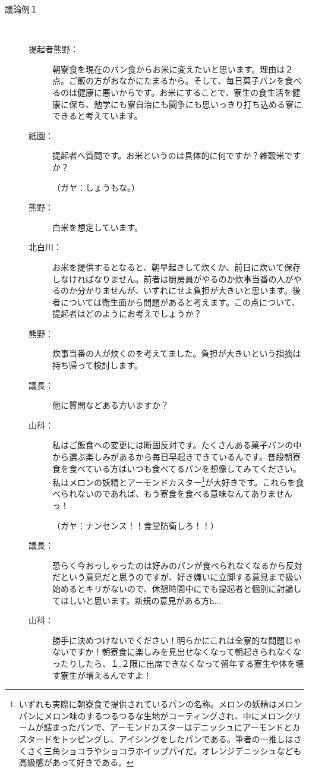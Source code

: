 \begin{description}
  \item[議論例１]\mbox{}\\
  \begin{description}
\item[提起者熊野：]朝寮食を現在のパン食からお米に変えたいと思います。理由は２点。ご飯の方がおなかにたまるから。そして、毎日菓子パンを食べるのは健康に悪いからです。お米にすることで、寮生の食生活を健康に保ち、勉学にも寮自治にも闘争にも思いっきり打ち込める寮にできると考えています。
\item[祇園：]提起者へ質問です。お米というのは具体的に何ですか？雑穀米ですか？
\par
\centerline{（ガヤ：しょうもな。）}
\item[熊野：]白米を想定しています。
\item[北白川：]お米を提供するとなると、朝早起きして炊くか、前日に炊いて保存しなければなりません。前者は厨房員がやるのか炊事当番の人がやるのか分かりませんが、いずれにせよ負担が大きいと思います。後者については衛生面から問題があると考えます。この点について、提起者はどのようにお考えでしょうか？
\item[熊野：]炊事当番の人が炊くのを考えてました。負担が大きいという指摘は持ち帰って検討します。
\item[議長：]他に質問などある方いますか？
\item[山科：]私はご飯食への変更には断固反対です。たくさんある菓子パンの中から選ぶ楽しみがあるから毎日早起きできているんです。普段朝寮食を食べている方はいつも食べてるパンを想像してみてください。私はメロンの妖精とアーモンドカスター\footnote{いずれも実際に朝寮食で提供されているパンの名称。メロンの妖精はメロンパンにメロン味のするつるつるな生地がコーティングされ、中にメロンクリームが詰まったパンで、アーモンドカスターはデニッシュにアーモンドとカスタードをトッピングし、アイシングをしたパンである。筆者の一推しはさくさく三角ショコラやショコラホイップパイだ。オレンジデニッシュなども高級感があって好きである。}が大好きです。これらを食べられないのであれば、もう寮食を食べる意味なんてありませんっ！
\par
\centerline{（ガヤ：ナンセンス！！食堂防衛しろ！！）}
\item[議長：]恐らく今おっしゃったのは好みのパンが食べられなくなるから反対だという意見だと思うのですが、好き嫌いに立脚する意見まで扱い始めるとキリがないので、休憩時間中にでも提起者と個別に討論してほしいと思います。新規の意見がある方h...
\item[山科：]勝手に決めつけないでください！明らかにこれは全寮的な問題じゃないですか！朝寮食に楽しみを見出せなくなって朝起きられなくなったりしたら、１,２限に出席できなくなって留年する寮生や体を壊す寮生が増えるんですよ！

\end{description}
\end{description}
